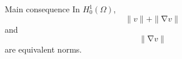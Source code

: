 \documentclass[aspectratio=169]{beamer}
\DeclareMathOperator{\grad}{\nabla}
\begin{document}
\begin{frame}{Main consequence}
    In $H_0^1(\Omega)$, 
    $$ \| v\| + \|\grad v\|$$
    and 
    $$ \|\grad v \| $$
    are equivalent norms.

\end{frame}

\begin{frame}
    \maketitle
\end{frame}
\end{document}
